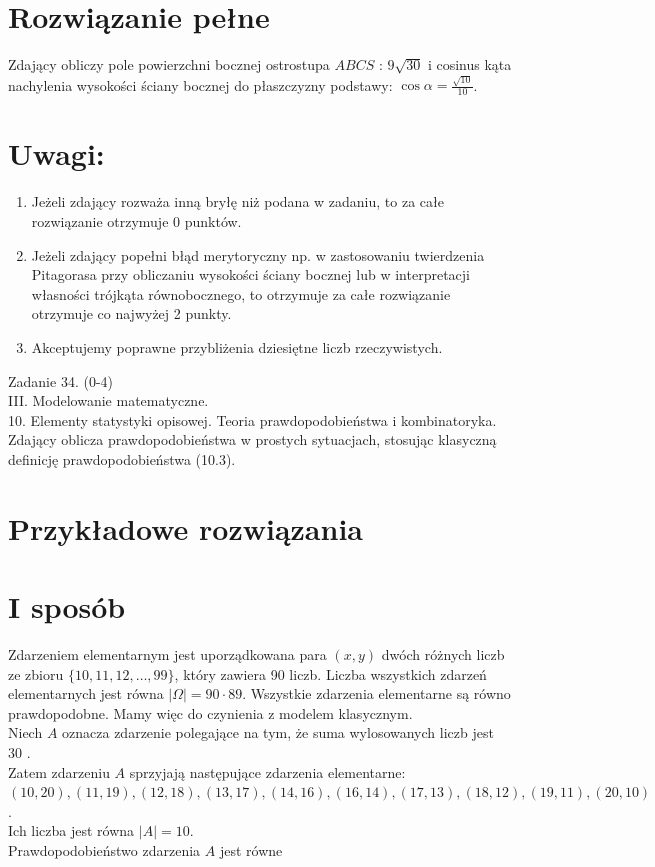 \documentclass[10pt]{article}
\begin{document}
\section*{Rozwiązanie pełne}
Zdający obliczy pole powierzchni bocznej ostrostupa $A B C S$ : $9 \sqrt{30}$ i cosinus kąta nachylenia wysokości ściany bocznej do płaszczyzny podstawy: $\cos \alpha=\frac{\sqrt{10}}{10}$.

\section*{Uwagi:}
\begin{enumerate}
  \item Jeżeli zdający rozważa inną bryłę niż podana w zadaniu, to za całe rozwiązanie otrzymuje 0 punktów.
  \item Jeżeli zdający popełni błąd merytoryczny np. w zastosowaniu twierdzenia Pitagorasa przy obliczaniu wysokości ściany bocznej lub w interpretacji własności trójkąta równobocznego, to otrzymuje za całe rozwiązanie otrzymuje co najwyżej 2 punkty.
  \item Akceptujemy poprawne przybliżenia dziesiętne liczb rzeczywistych.
\end{enumerate}

Zadanie 34. (0-4)\\
III. Modelowanie matematyczne.\\
10. Elementy statystyki opisowej. Teoria prawdopodobieństwa i kombinatoryka. Zdający oblicza prawdopodobieństwa w prostych sytuacjach, stosując klasyczną definicję prawdopodobieństwa (10.3).

\section*{Przykładowe rozwiązania}
\section*{I sposób}
Zdarzeniem elementarnym jest uporządkowana para $(x, y)$ dwóch różnych liczb ze zbioru $\{10,11,12, \ldots, 99\}$, który zawiera 90 liczb. Liczba wszystkich zdarzeń elementarnych jest równa $|\Omega|=90 \cdot 89$. Wszystkie zdarzenia elementarne są równo prawdopodobne. Mamy więc do czynienia z modelem klasycznym.\\
Niech $A$ oznacza zdarzenie polegające na tym, że suma wylosowanych liczb jest 30 .\\
Zatem zdarzeniu $A$ sprzyjają następujące zdarzenia elementarne:\\
$(10,20),(11,19),(12,18),(13,17),(14,16),(16,14),(17,13),(18,12),(19,11),(20,10)$.\\
Ich liczba jest równa $|A|=10$.\\
Prawdopodobieństwo zdarzenia $A$ jest równe
\end{document}
